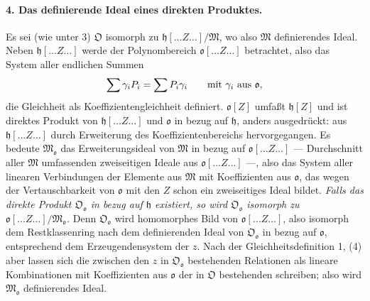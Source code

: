 \paragraph{4. Das definierende Ideal eines direkten Produktes.}
Es sei (wie unter 3) $\mathfrak O$ isomorph zu $\mathfrak h[\ldots Z\ldots]/\mathfrak M$, wo also $\mathfrak M$ definierendes Ideal. Neben $\mathfrak h[\ldots Z\ldots]$ werde der Polynombereich $\mathfrak o[\ldots Z\ldots]$ betrachtet, also das System aller endlichen Summen
\[
\sum \gamma_iP_i=\sum P_i\gamma_i
\qquad\hbox{mit }\gamma_i\hbox{ aus }\mathfrak o,
\]
die Gleichheit als Koeffizientengleichheit definiert. $\mathfrak o[Z]$ umfaßt $\mathfrak h[Z]$ und ist direktes Produkt von $\mathfrak h[\ldots Z\ldots]$ und $\mathfrak o$ in bezug auf $\mathfrak h$, anders ausgedrückt: aus $\mathfrak h[\ldots Z\ldots]$ durch Erweiterung des Koeffizientenbereichs hervorgegangen. Es bedeute $\mathfrak M_{\mathfrak o}$ das Erweiterungsideal von $\mathfrak M$ in bezug auf $\mathfrak o[\ldots Z\ldots]$ --- Durchschnitt aller $\mathfrak M$ umfassenden zweiseitigen Ideale aus $\mathfrak o[\ldots Z\ldots]$ ---, also das System aller linearen Verbindungen der Elemente aus $\mathfrak M$ mit Koeffizienten aus $\mathfrak o$, das wegen der Vertauschbarkeit von $\mathfrak o$ mit den $Z$ schon ein zweiseitiges Ideal bildet. \emph{Falls das direkte Produkt $\mathfrak O_{\mathfrak o}$ in bezug auf $\mathfrak h$ existiert, so wird $\mathfrak O_{\mathfrak o}$ isomorph zu $\mathfrak o[\ldots Z\ldots]/\mathfrak M_{\mathfrak o}$.} Denn $\mathfrak O_{\mathfrak o}$ wird homomorphes Bild von $\mathfrak o[\ldots Z\ldots]$, also isomorph dem Restklassenring nach dem definierenden Ideal von $\mathfrak O_{\mathfrak o}$ in bezug auf $\mathfrak o$, entsprechend dem Erzeugendensystem der $z$. Nach der Gleichheitsdefinition 1, (4) aber lassen sich die zwischen den $z$ in $\mathfrak O_{\mathfrak o}$ bestehenden Relationen als lineare Kombinationen mit Koeffizienten aus $\mathfrak o$ der in $\mathfrak O$ bestehenden schreiben; also wird $\mathfrak M_{\mathfrak o}$ definierendes Ideal.

